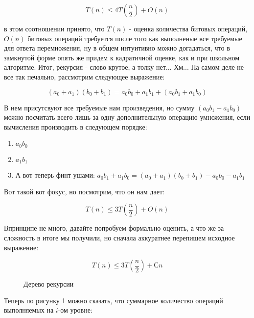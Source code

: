 \begin{equation}
	T(n)\le4T(\frac{n}{2}) + O(n)
\end{equation}

в этом соотношении принято, что $T(n)$ - оценка количества битовых операций, $O(n)$ битовых операций требуется после того как выполненые все требуемые для ответа перемножения, ну в общем интуитивно можно догадаться, что в замкнутой форме опять же придем к кадратичной оценке, как и при школьном алгоритме. Итог, рекурсия - слово крутое, а толку нет... Хм... На самом деле не все так печально, рассмотрим следующее выражение:

\begin{equation}
	(a_0 + a_1)(b_0 + b_1) = a_0b_0 + a_1b_1 + (a_0b_1 + a_1b_0)
\end{equation}

В нем присутсвуют все требуемые нам произведения, но сумму $(a_0b_1 + a_1b_0)$ можно посчитать всего лишь за одну дополнительную операцию умножения, если вычисления производить в следующем порядке:

\begin{enumerate}
\item $a_0b_0$

\item $a_1b_1$

\item А вот теперь финт ушами: $a_0b_1+a_1b_0 = (a_0+a_1)(b_0+b_1) - a_0b_0 - a_1b_1$
\end{enumerate}

Вот такой вот фокус, но посмотрим, что он нам дает:

\begin{equation}
	T(n) \le 3T(\frac{n}{2}) + O(n)
\end{equation}

Впринципе не много, давайте попробуем формально оценить, а что же за сложность в итоге мы получили, но сначала аккуратнее перепишем исходное выражение:

\begin{equation}
	T(n) \le 3T(\frac{n}{2}) + Сn
\end{equation}

\begin{figure}[h]
	\noindent{}
	\caption{Дерево рекурсии}
	\label{pic::mul_tree}
\end{figure}

Теперь по рисунку \ref{pic::mul_tree} можно сказать, что суммарное количество операций выполняемых на $i$-ом уровне:


